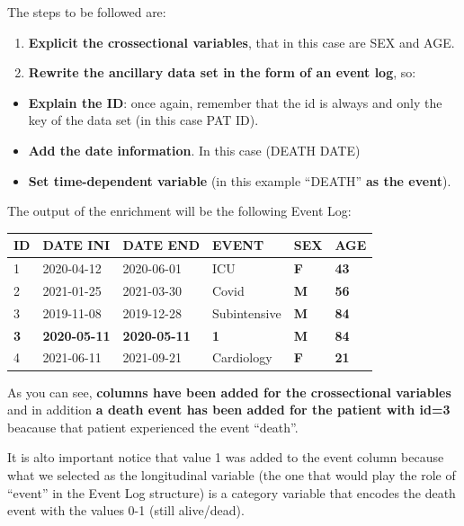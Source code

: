 \documentclass[
]{book}
\providecommand{\tightlist}{%
  \setlength{\itemsep}{0pt}\setlength{\parskip}{0pt}}
\begin{document}
The steps to be followed are:

\begin{enumerate}
\def\labelenumi{\arabic{enumi}.}
\tightlist
\item
  \textbf{Explicit the crossectional variables}, that in this case are SEX and AGE.
\item
  \textbf{Rewrite the ancillary data set in the form of an event log}, so:
\end{enumerate}

\begin{itemize}
\tightlist
\item
  \textbf{Explain the ID}: once again, remember that the id is always and only the key of the data set (in this case PAT ID).
\item
  \textbf{Add the date information}. In this case (DEATH DATE)
\item
  \textbf{Set time-dependent variable} (in this example ``DEATH'' \textbf{as the event}).
\end{itemize}

The output of the enrichment will be the following Event Log:

\begin{longtable}[]{@{}llllll@{}}
\toprule
ID & DATE INI & DATE END & EVENT & \textbf{SEX} & \textbf{AGE} \\
\midrule
\endhead
1 & 2020-04-12 & 2020-06-01 & ICU & \textbf{F} & \textbf{43} \\
2 & 2021-01-25 & 2021-03-30 & Covid & \textbf{M} & \textbf{56} \\
3 & 2019-11-08 & 2019-12-28 & Subintensive & \textbf{M} & \textbf{84} \\
\textbf{3} & \textbf{2020-05-11} & \textbf{2020-05-11} & \textbf{1} & \textbf{M} & \textbf{84} \\
4 & 2021-06-11 & 2021-09-21 & Cardiology & \textbf{F} & \textbf{21} \\
\bottomrule
\end{longtable}

As you can see, \textbf{columns have been added for the crossectional variables} and in addition \textbf{a death event has been added for the patient with id=3} beacause that patient experienced the event ``death''.

It is alto important notice that value 1 was added to the event column because what we selected as the longitudinal variable (the one that would play the role of ``event'' in the Event Log structure) is a category variable that encodes the death event with the values 0-1 (still alive/dead).
\end{document}
